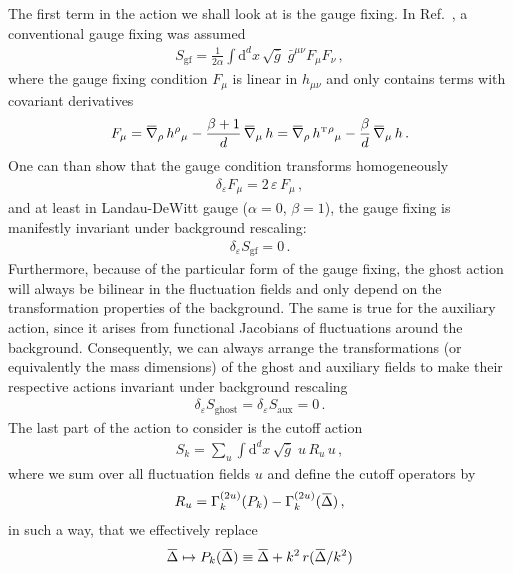 \documentclass[11pt]{book}
\newcommand{\overbar}[1]{\mkern 1.5mu\overline{\mkern-1.5mu#1\mkern-1.5mu}\mkern 1.5mu}
\newcommand\hT{ h^{\scriptscriptstyle{\mathrm{T}} } }
\newcommand{\bnabla}{\overbar \nabla}
\newcommand{\weyl}{\delta_\varepsilon}
\numberwithin{equation}{chapter}
\begin{document}
The first term in the action we shall look at is the gauge fixing. In Ref.~\cite{Morris:2016spn},
a conventional gauge fixing was assumed
\begin{align}
  S_\mathrm{gf} = \frac{1}{2\alpha} \int \mathrm d^dx \, \sqrt{\bar g} \; \bar g^{\mu\nu} F_\mu F_\nu \,,
\end{align}
where the gauge fixing condition $F_\mu$ is linear in $h_{\mu\nu}$ and only contains terms
with covariant derivatives
\begin{align}
  F_\mu = \bnabla_\rho \, h{}^\rho{}_\mu - \frac{\beta + 1}{d} \, \bnabla_\mu \, h
  = \bnabla_\rho \, \hT{}^\rho{}_\mu - \frac{\beta}{d} \, \bnabla_\mu \, h \,.
\end{align}
One can than show that the gauge condition transforms homogeneously
\begin{align}
  \weyl F_\mu = 2 \, \varepsilon \, F_\mu \,,
\end{align}
and at least in Landau-DeWitt gauge ($\alpha=0$, $\beta=1$), the gauge fixing
is manifestly invariant under background rescaling:
\begin{align}
  \weyl S_\mathrm{gf} = 0 \,.
\end{align}
Furthermore, because of the particular form of the gauge fixing, the ghost action
will always be bilinear in the fluctuation fields and only depend on the transformation
properties of the background. The same is true for the auxiliary action, since it
arises from functional Jacobians of fluctuations around the background. Consequently,
we can always arrange the transformations (or equivalently the mass dimensions)
of the ghost and auxiliary fields to make their respective actions invariant
under background rescaling
\begin{align}
  \weyl S_\mathrm{ghost} = \weyl S_\mathrm{aux} = 0 \,.
\end{align}
The last part of the action to consider is the cutoff action
\begin{align}
  S_k = \sum_u \int \mathrm d^dx \, \sqrt{\bar g} \; u \, R_u \, u \,,
\end{align}
where we sum over all fluctuation fields $u$ and define the cutoff operators by
\begin{align}
  R_u = \Gamma^{(2u)}_k (P_k) - \Gamma^{(2u)}_k (\overbar \Delta) \,,
\end{align}
in such a way, that we effectively replace
\begin{align}
  \overbar \Delta \mapsto P_k(\overbar \Delta) \equiv \overbar \Delta + k^2 \, r(\overbar\Delta/k^2)
\end{align}
\end{document}
